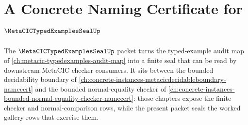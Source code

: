 \chapter{A Concrete Naming Certificate for $\MetaCICTypedExamplesSealUp$}
\label{ch:concrete-instances-metacic-typedexamples-seal-namecert}

The $\MetaCICTypedExamplesSealUp$ packet turns the typed-example audit map of \autoref{ch:metacic-typedexamples-audit-map} into a finite seal that can be read by downstream MetaCIC checker consumers. It sits between the bounded decidability boundary of \autoref{ch:concrete-instances-metacicdecidableboundary-namecert} and the bounded normal-equality checker of \autoref{ch:concrete-instances-bounded-normal-equality-checker-namecert}: those chapters expose the finite checker and normal-comparison rows, while the present packet seals the worked gallery rows that exercise them.

